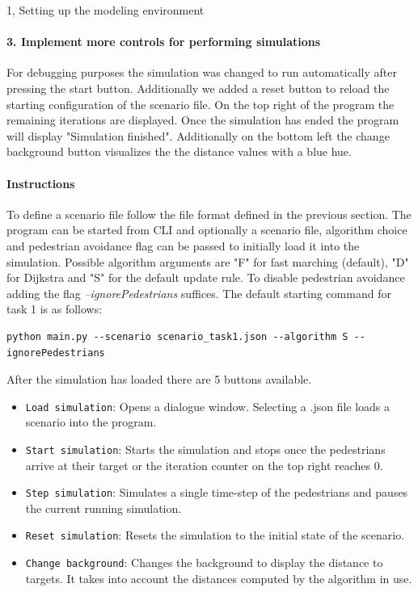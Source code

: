 \documentclass[10pt,a4paper]{article}
\begin{document}
\begin{task}{1, Setting up the modeling environment}
\paragraph{3. Implement more controls for performing simulations}
For debugging purposes the simulation was changed to run automatically after pressing the start button. Additionally we added a reset button to reload the starting configuration of the scenario file. On the top right of the program the remaining iterations are displayed. Once the simulation has ended the program will display "Simulation finished". Additionally on the bottom left the change background button visualizes the the distance values with a blue hue.

\paragraph{Instructions} To define a scenario file follow the file format defined in the previous section. The program can be started from CLI and optionally a scenario file, algorithm choice and pedestrian avoidance flag can be passed to initially load it into the simulation. Possible algorithm arguments are "F" for fast marching (default), "D" for Dijkstra and "S" for the default update rule. To disable pedestrian avoidance adding the flag \textit{--ignorePedestrians} suffices. The default starting command for task 1 is as follows:

\begin{verbatim}
python main.py --scenario scenario_task1.json --algorithm S --ignorePedestrians
\end{verbatim}

After the simulation has loaded there are 5 buttons available.
\begin{itemize}
    \item \texttt{Load simulation}: Opens a dialogue window. Selecting a .json file loads a scenario into the program. 
    \item \texttt{Start simulation}: Starts the simulation and stops once the pedestrians arrive at their target or the iteration counter on the top right reaches 0.
    \item \texttt{Step simulation}: Simulates a single time-step of the pedestrians and pauses the current running simulation.
    \item \texttt{Reset simulation}: Resets the simulation to the initial state of the scenario.
    \item \texttt{Change background}: Changes the background to display the distance to targets. It takes into account the distances computed by the algorithm in use.
\end{itemize}


\end{task}
\end{document}
